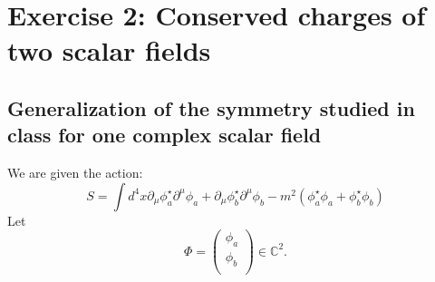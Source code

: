 \section{Exercise 2: Conserved charges of two scalar
fields}
\subsection{Generalization of the symmetry studied in class for one complex scalar field}
We are given the action:
\begin{equation}
    S = \int d^4 x \partial_\mu \phi_a^\star \partial^{\mu}\phi_a + \partial_\mu \phi_b^\star \partial^\mu \phi_b  - m^2 (\phi_a^\star \phi_a + \phi_b^\star \phi_b ) 
\end{equation}
Let
\begin{equation}
    \Phi = 
    \begin{pmatrix}
        \phi_a \\
        \phi_b \\
    \end{pmatrix}\in \mathbb C^2.
\end{equation}

